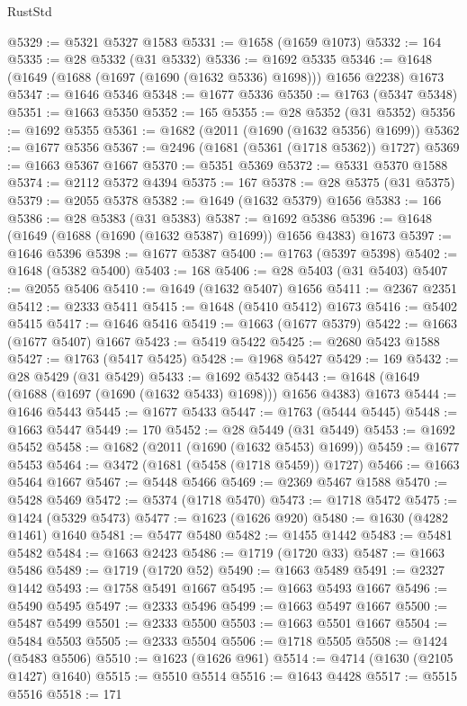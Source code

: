 \begin{lexlean}{RustStd}
\begin{coremodule}
{\begin{coremodule}
{{{{{{{{{{{{{{{{{{{{{{{{{{{{{{{{{{{{{{{{{{{{@5329 := @5321 @5327 @1583
@5331 := @1658 (@1659 @1073)
@5332 := 164
@5335 := @28 @5332 (@31 @5332)
@5336 := @1692 @5335
@5346 := @1648 (@1649 (@1688 (@1697 (@1690 (@1632 @5336) @1698))) @1656 @2238) @1673
@5347 := @1646 @5346
@5348 := @1677 @5336
@5350 := @1763 (@5347 @5348)
@5351 := @1663 @5350
@5352 := 165
@5355 := @28 @5352 (@31 @5352)
@5356 := @1692 @5355
@5361 := @1682 (@2011 (@1690 (@1632 @5356) @1699))
@5362 := @1677 @5356
@5367 := @2496 (@1681 (@5361 (@1718 @5362)) @1727)
@5369 := @1663 @5367 @1667
@5370 := @5351 @5369
@5372 := @5331 @5370 @1588
@5374 := @2112 @5372 @4394
@5375 := 167
@5378 := @28 @5375 (@31 @5375)
@5379 := @2055 @5378
@5382 := @1649 (@1632 @5379) @1656
@5383 := 166
@5386 := @28 @5383 (@31 @5383)
@5387 := @1692 @5386
@5396 := @1648 (@1649 (@1688 (@1690 (@1632 @5387) @1699)) @1656 @4383) @1673
@5397 := @1646 @5396
@5398 := @1677 @5387
@5400 := @1763 (@5397 @5398)
@5402 := @1648 (@5382 @5400)
@5403 := 168
@5406 := @28 @5403 (@31 @5403)
@5407 := @2055 @5406
@5410 := @1649 (@1632 @5407) @1656
@5411 := @2367 @2351
@5412 := @2333 @5411
@5415 := @1648 (@5410 @5412) @1673
@5416 := @5402 @5415
@5417 := @1646 @5416
@5419 := @1663 (@1677 @5379)
@5422 := @1663 (@1677 @5407) @1667
@5423 := @5419 @5422
@5425 := @2680 @5423 @1588
@5427 := @1763 (@5417 @5425)
@5428 := @1968 @5427
@5429 := 169
@5432 := @28 @5429 (@31 @5429)
@5433 := @1692 @5432
@5443 := @1648 (@1649 (@1688 (@1697 (@1690 (@1632 @5433) @1698))) @1656 @4383) @1673
@5444 := @1646 @5443
@5445 := @1677 @5433
@5447 := @1763 (@5444 @5445)
@5448 := @1663 @5447
@5449 := 170
@5452 := @28 @5449 (@31 @5449)
@5453 := @1692 @5452
@5458 := @1682 (@2011 (@1690 (@1632 @5453) @1699))
@5459 := @1677 @5453
@5464 := @3472 (@1681 (@5458 (@1718 @5459)) @1727)
@5466 := @1663 @5464 @1667
@5467 := @5448 @5466
@5469 := @2369 @5467 @1588
@5470 := @5428 @5469
@5472 := @5374 (@1718 @5470)
@5473 := @1718 @5472
@5475 := @1424 (@5329 @5473)
@5477 := @1623 (@1626 @920)
@5480 := @1630 (@4282 @1461) @1640
@5481 := @5477 @5480
@5482 := @1455 @1442
@5483 := @5481 @5482
@5484 := @1663 @2423
@5486 := @1719 (@1720 @33)
@5487 := @1663 @5486
@5489 := @1719 (@1720 @52)
@5490 := @1663 @5489
@5491 := @2327 @1442
@5493 := @1758 @5491 @1667
@5495 := @1663 @5493 @1667
@5496 := @5490 @5495
@5497 := @2333 @5496
@5499 := @1663 @5497 @1667
@5500 := @5487 @5499
@5501 := @2333 @5500
@5503 := @1663 @5501 @1667
@5504 := @5484 @5503
@5505 := @2333 @5504
@5506 := @1718 @5505
@5508 := @1424 (@5483 @5506)
@5510 := @1623 (@1626 @961)
@5514 := @4714 (@1630 (@2105 @1427) @1640)
@5515 := @5510 @5514
@5516 := @1643 @4428
@5517 := @5515 @5516
@5518 := 171
}}}}}}}}}}}}}}}}}}}}}}}}}}}}}}}}}}}}}}}}}}}}
\end{coremodule}}
\end{coremodule}
\end{lexlean}
